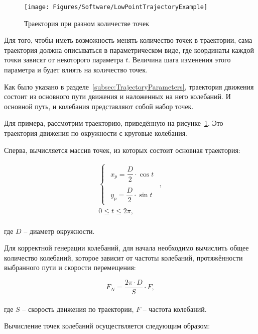 \begin{figure}[H]
    \centering
    \vspace{14pt}
    \texttt{[image: Figures/Software/LowPointTrajectoryExample]}
    \caption{Траектория при разном количестве точек}
    \label{fig:LowPointTrajectoryExample}
\end{figure}

Для того, чтобы иметь возможность менять количество точек в траектории, сама траектория должна описываться в параметрическом виде, где координаты каждой точки зависят от некоторого параметра $t$.
Величина шага изменения этого параметра и будет влиять на количество точек.

Как было указано в разделе~\ref{subsec:TrajectoryParameters}, траектория движения состоит из основного пути движения и наложенных на него колебаний.
И основной путь, и колебания представляют собой набор точек.

Для примера, рассмотрим траекторию, приведённую на рисунке~\ref{fig:LowPointTrajectoryExample}.
Это траектория движения по окружности с круговые колебания.

Сперва, вычисляется массив точек, из которых состоит основная траектория:

\begin{gather*}
    \begin{cases}
        \begin{aligned}
            x_p = \dfrac{D}{2} \cdot \cos t \\
            \\
            y_p = \dfrac{D}{2} \cdot \sin t
        \end{aligned}
    \end{cases}, \\
    0 \leq t \leq 2 \pi,
\end{gather*} \\
где $D$ -- диаметр окружности.

Для корректной генерации колебаний, для начала необходимо вычислить общее количество колебаний, которое зависит от частоты колебаний, протяжённости выбранного пути и скорости перемещения:

\begin{equation*}
    F_N = \dfrac{2 \pi \cdot D}{S} \cdot F,
\end{equation*} \\
где $S$ -- скорость движения по траектории, $F$ -- частота колебаний.

Вычисление точек колебаний осуществляется следующим образом:

